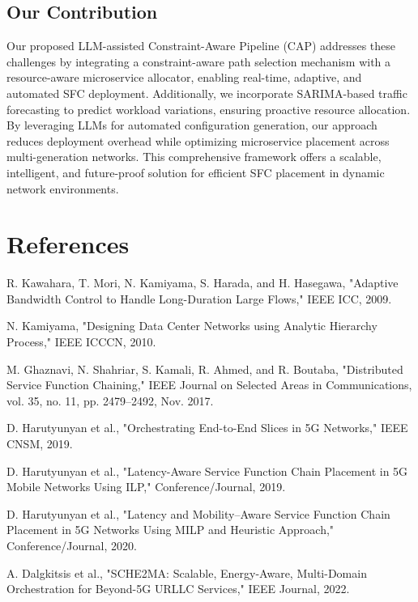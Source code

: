 \documentclass[conference]{IEEEtran}
\begin{document}
\subsection{Our Contribution}
Our proposed LLM-assisted Constraint-Aware Pipeline (CAP) addresses these challenges by integrating a constraint-aware path selection mechanism with a resource-aware microservice allocator, enabling real-time, adaptive, and automated SFC deployment. Additionally, we incorporate SARIMA-based traffic forecasting to predict workload variations, ensuring proactive resource allocation. By leveraging LLMs for automated configuration generation, our approach reduces deployment overhead while optimizing microservice placement across multi-generation networks. This comprehensive framework offers a scalable, intelligent, and future-proof solution for efficient SFC placement in dynamic network environments.

\section{References}

\begin{thebibliography}{99}
	
	R. Kawahara, T. Mori, N. Kamiyama, S. Harada, and H. Hasegawa,  
	"Adaptive Bandwidth Control to Handle Long-Duration Large Flows,"  
	IEEE ICC, 2009.
	
	N. Kamiyama,  
	"Designing Data Center Networks using Analytic Hierarchy Process,"  
	IEEE ICCCN, 2010.
	
	M. Ghaznavi, N. Shahriar, S. Kamali, R. Ahmed, and R. Boutaba,  
	"Distributed Service Function Chaining,"  
	IEEE Journal on Selected Areas in Communications, vol. 35, no. 11, pp. 2479–2492, Nov. 2017.
	
	D. Harutyunyan et al.,  
	"Orchestrating End-to-End Slices in 5G Networks,"  
	IEEE CNSM, 2019.
	
	D. Harutyunyan et al.,  
	"Latency-Aware Service Function Chain Placement in 5G Mobile Networks Using ILP,"  
	Conference/Journal, 2019.
	
	D. Harutyunyan et al.,  
	"Latency and Mobility–Aware Service Function Chain Placement in 5G Networks Using MILP and Heuristic Approach,"  
	Conference/Journal, 2020.
	
	A. Dalgkitsis et al.,  
	"SCHE2MA: Scalable, Energy-Aware, Multi-Domain Orchestration for Beyond-5G URLLC Services,"  
	IEEE Journal, 2022.
	
\end{thebibliography}

	
\end{document}
